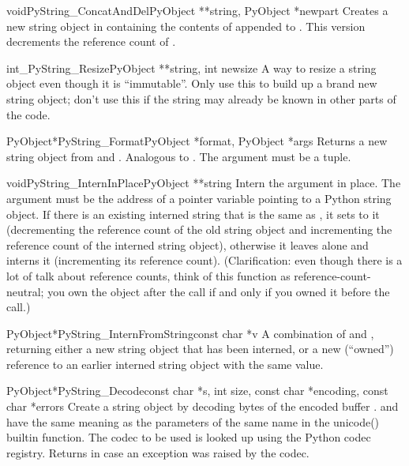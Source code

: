 \documentclass{manual}
\begin{document}
\begin{cfuncdesc}{void}{PyString_ConcatAndDel}{PyObject **string,
                                               PyObject *newpart}
Creates a new string object in  containing the contents
of  appended to .  This version decrements
the reference count of .
\end{cfuncdesc}

\begin{cfuncdesc}{int}{_PyString_Resize}{PyObject **string, int newsize}
A way to resize a string object even though it is ``immutable''.  
Only use this to build up a brand new string object; don't use this if
the string may already be known in other parts of the code.
\end{cfuncdesc}

\begin{cfuncdesc}{PyObject*}{PyString_Format}{PyObject *format,
                                              PyObject *args}
Returns a new string object from  and .  Analogous
to .  The  argument must be
a tuple.
\end{cfuncdesc}

\begin{cfuncdesc}{void}{PyString_InternInPlace}{PyObject **string}
Intern the argument  in place.  The argument must be the
address of a pointer variable pointing to a Python string object.
If there is an existing interned string that is the same as
, it sets  to it (decrementing the reference 
count of the old string object and incrementing the reference count of
the interned string object), otherwise it leaves  alone
and interns it (incrementing its reference count).  (Clarification:
even though there is a lot of talk about reference counts, think of
this function as reference-count-neutral; you own the object after
the call if and only if you owned it before the call.)
\end{cfuncdesc}

\begin{cfuncdesc}{PyObject*}{PyString_InternFromString}{const char *v}
A combination of  and
, returning either a new string object
that has been interned, or a new (``owned'') reference to an earlier
interned string object with the same value.
\end{cfuncdesc}

\begin{cfuncdesc}{PyObject*}{PyString_Decode}{const char *s,
                                               int size,
                                               const char *encoding,
                                               const char *errors}
Create a string object by decoding  bytes of the encoded
buffer .  and  have the same meaning
as the parameters of the same name in the unicode() builtin
function. The codec to be used is looked up using the Python codec
registry. Returns \NULL{} in case an exception was raised by the
codec.
\end{cfuncdesc}
\end{document}
